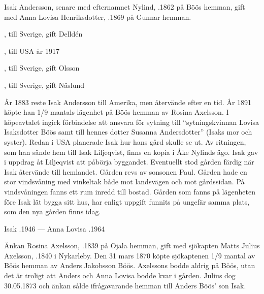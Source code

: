 Isak Andersson, senare med efternamnet Nylind, .1862 på Böös hemman, gift med Anna Lovisa Henriksdotter, .1869 på Gunnar hemman.
\begin{jhchildren}
  \item {}, till Sverige, gift Delldén
  \item {}, till USA år 1917
  \item {}
  \item {}
  \item {}
  \item {}
  \item {}, till Sverige, gift Olsson
  \item {}, till Sverige, gift Näslund
\end{jhchildren}
År 1883 reste Isak Andersson till Amerika, men återvände efter en tid. År 1891 köpte han 1/9 mantals lägenhet på Böös hemman av Rosina Axelsson. I köpeavtalet ingick förbindelse att ansvara för sytning till ``sytningskvinnan Lovisa Isaksdotter Böös samt till hennes dotter Susanna Andersdotter'' (Isaks mor och syster). Redan i USA planerade Isak hur hans gård skulle se ut. Av ritningen, som han sände	hem till Isak Liljeqvist, finns en kopia i Åke Nylinds ägo. Isak gav i uppdrag åt Liljeqvist att påbörja byggandet. Eventuellt stod gården	färdig när Isak återvände till hemlandet. Gården revs av sonsonen Paul. Gården hade en stor vindsvåning med vinkeltak både mot landsvägen och mot gårdssidan. På vindsvåningen fanns ett rum inredd till bostad. Gården som fanns på lägenheten före Isak lät bygga sitt hus, har enligt uppgift funnits på ungefär samma plats, som den nya gården finns idag.

Isak .1946  ---  Anna Lovisa .1964


Änkan Rosina Axelsson, .1839 på Ojala hemman, gift med sjökapten Matts Julius Axelsson, .1840 i Nykarleby. Den 31 mars 1870 köpte sjökaptenen 1/9 mantal av Böös hemman av Anders Jakobsson Böös. Axelssons bodde aldrig på Böös, utan det är troligt att Anders och Anna Lovisa bodde kvar i gården. Julius dog 30.05.1873 och änkan sålde ifrågavarande hemman till Anders Böös' son Isak.



